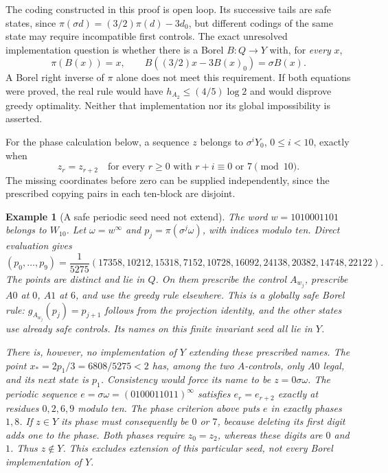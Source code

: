 \documentclass[11pt,reqno]{amsart}
\numberwithin{equation}{section}
\newtheorem{example}[theorem]{Example}
\theoremstyle{definition}
\begin{document}
The coding constructed in this proof is open loop. Its successive
tails are safe states, since
$\pi(\sigma d)=(3/2)\pi(d)-3d_0$, but different codings
of the same state may require incompatible first controls.
The exact unresolved implementation question is whether there is
a Borel $B:Q\to Y$ with, for \emph{every} $x$,
\begin{equation}\label{eq:implementation}
 \pi(B(x))=x,\qquad
 B((3/2)x-3B(x)_0)=\sigma B(x).
\end{equation}
A Borel right inverse of $\pi$ alone does not meet this requirement.
If both equations were proved, the real rule would have
$h_{A_2}\le(4/5)\log2$ and would disprove greedy optimality.
Neither that implementation nor its global impossibility is asserted.


For the phase calculation below, a sequence $z$ belongs to
$\sigma^iY_0$, $0\le i<10$, exactly when
\[
 z_r=z_{r+2}\quad\text{for every }r\ge0
 \text{ with }r+i\equiv0\text{ or }7\pmod {10}.
\]
The missing coordinates before zero can be supplied independently,
since the prescribed copying pairs in each ten-block are disjoint.

\begin{example}[A safe periodic seed need not extend]
\label{ex:periodic-seed}
The word $w=1010001101$ belongs to $W_{10}$. Let
$\omega=w^\infty$ and $p_j=\pi(\sigma^j\omega)$, with indices
modulo ten. Direct evaluation gives
\[
 (p_0,\ldots,p_9)=\frac1{5275}
 (17358,10212,15318,7152,10728,16092,24138,20382,14748,22122).
\]
The points are distinct and lie in $Q$. On them prescribe the
control $A_{w_j}$, prescribe $A0$ at $0$, $A1$ at $6$, and use
the greedy rule elsewhere. This is a globally safe Borel rule:
$g_{A_{w_j}}(p_j)=p_{j+1}$ follows from the projection identity,
and the other states use already safe controls. Its names on
this finite invariant seed all lie in $Y$.

There is, however, no implementation of $Y$ extending these
prescribed names. The point
$x_*=2p_1/3=6808/5275<2$ has, among the two $A$-controls,
only $A0$ legal, and its next state is $p_1$. Consistency would force its name to be
$z=0\sigma\omega$. The periodic sequence
$e=\sigma\omega=(0100011011)^\infty$ satisfies
$e_r=e_{r+2}$ exactly at residues $0,2,6,9$ modulo ten.
The phase criterion above puts $e$ in exactly phases $1,8$.
If $z\in Y$ its phase must consequently be $0$ or $7$, because
deleting its first digit adds one to the phase. Both phases require
$z_0=z_2$, whereas these digits are $0$ and $1$.
Thus $z\notin Y$. This excludes extension of this particular
seed, not every Borel implementation of $Y$.
\end{example}
\end{document}
